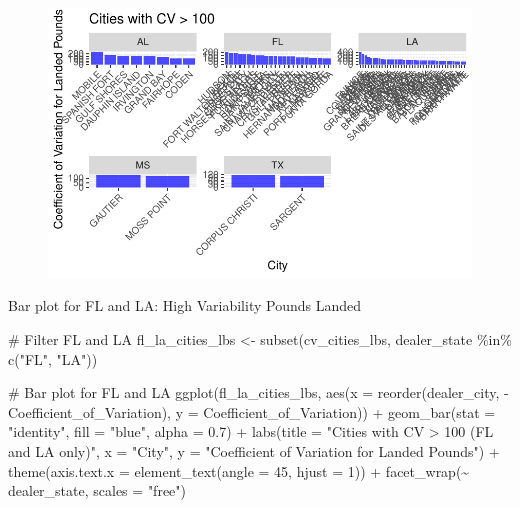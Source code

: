 \documentclass[
  letterpaper,
  DIV=11,
  numbers=noendperiod]{scrartcl}
\newenvironment{Shaded}{\begin{snugshade}}{\end{snugshade}}
\newcommand{\AttributeTok}[1]{\textcolor[rgb]{0.40,0.45,0.13}{#1}}
\newcommand{\CommentTok}[1]{\textcolor[rgb]{0.37,0.37,0.37}{#1}}
\newcommand{\DecValTok}[1]{\textcolor[rgb]{0.68,0.00,0.00}{#1}}
\newcommand{\FloatTok}[1]{\textcolor[rgb]{0.68,0.00,0.00}{#1}}
\newcommand{\FunctionTok}[1]{\textcolor[rgb]{0.28,0.35,0.67}{#1}}
\newcommand{\NormalTok}[1]{\textcolor[rgb]{0.00,0.23,0.31}{#1}}
\newcommand{\OtherTok}[1]{\textcolor[rgb]{0.00,0.23,0.31}{#1}}
\newcommand{\SpecialCharTok}[1]{\textcolor[rgb]{0.37,0.37,0.37}{#1}}
\newcommand{\StringTok}[1]{\textcolor[rgb]{0.13,0.47,0.30}{#1}}
\begin{document}
\begin{figure}[H]

{\centering \includegraphics{CV_Communities2_files/figure-pdf/unnamed-chunk-18-1.pdf}

}

\end{figure}

Bar plot for FL and LA: High Variability Pounds Landed

\begin{Shaded}
\begin{Highlighting}[]
\CommentTok{\# Filter FL and LA}
\NormalTok{fl\_la\_cities\_lbs }\OtherTok{\textless{}{-}} \FunctionTok{subset}\NormalTok{(cv\_cities\_lbs, dealer\_state }\SpecialCharTok{\%in\%} \FunctionTok{c}\NormalTok{(}\StringTok{"FL"}\NormalTok{, }\StringTok{"LA"}\NormalTok{))}

\CommentTok{\# Bar plot for FL and LA}
\FunctionTok{ggplot}\NormalTok{(fl\_la\_cities\_lbs, }\FunctionTok{aes}\NormalTok{(}\AttributeTok{x =} \FunctionTok{reorder}\NormalTok{(dealer\_city, }\SpecialCharTok{{-}}\NormalTok{Coefficient\_of\_Variation), }\AttributeTok{y =}\NormalTok{ Coefficient\_of\_Variation)) }\SpecialCharTok{+}
  \FunctionTok{geom\_bar}\NormalTok{(}\AttributeTok{stat =} \StringTok{"identity"}\NormalTok{, }\AttributeTok{fill =} \StringTok{"blue"}\NormalTok{, }\AttributeTok{alpha =} \FloatTok{0.7}\NormalTok{) }\SpecialCharTok{+}
  \FunctionTok{labs}\NormalTok{(}\AttributeTok{title =} \StringTok{"Cities with CV \textgreater{} 100 (FL and LA only)"}\NormalTok{, }\AttributeTok{x =} \StringTok{"City"}\NormalTok{, }\AttributeTok{y =} \StringTok{"Coefficient of Variation for Landed Pounds"}\NormalTok{) }\SpecialCharTok{+}
  \FunctionTok{theme}\NormalTok{(}\AttributeTok{axis.text.x =} \FunctionTok{element\_text}\NormalTok{(}\AttributeTok{angle =} \DecValTok{45}\NormalTok{, }\AttributeTok{hjust =} \DecValTok{1}\NormalTok{)) }\SpecialCharTok{+}
  \FunctionTok{facet\_wrap}\NormalTok{(}\SpecialCharTok{\textasciitilde{}}\NormalTok{ dealer\_state, }\AttributeTok{scales =} \StringTok{"free"}\NormalTok{)}
\end{Highlighting}
\end{Shaded}
\end{document}
